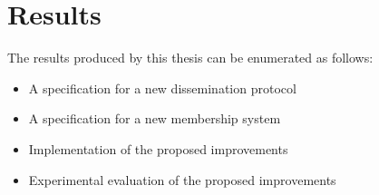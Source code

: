 



\section{Results}
\label{chap:results}

The results produced by this thesis can be enumerated as follows:
\begin{itemize}
  \item A specification for a new dissemination protocol
  \item A specification for a new membership system
  \item Implementation of the proposed improvements
  \item Experimental evaluation of the proposed improvements
\end{itemize}

